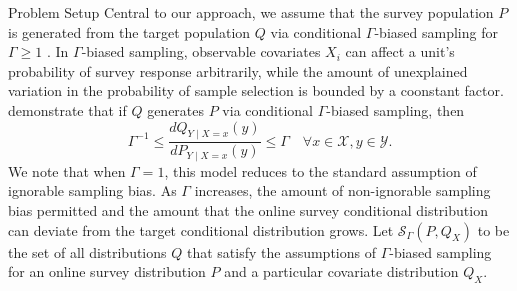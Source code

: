 \begin{subsection}{Problem Setup}
Central to our approach, we assume that the survey population $P$ is generated from the target population $Q$ via conditional $\Gamma$-biased sampling for $\Gamma \geq 1$ \citep{sahoo2022learning}. In $\Gamma$-biased sampling, observable covariates $X_{i}$ can affect a unit's probability of survey response arbitrarily, while the amount of unexplained variation in the probability of sample selection is bounded by a coonstant factor. \citet{sahoo2022learning} demonstrate that if $Q$ generates $P$ via conditional $\Gamma$-biased sampling, then
\begin{equation} \Gamma^{-1} \leq \frac{dQ_{Y \mid X=x}(y)}{dP_{Y \mid X=x}(y)} \leq \Gamma \quad \forall x \in \mathcal{X}, y \in \mathcal{Y}.\end{equation}
We note that when $\Gamma = 1$, this model reduces to the standard assumption of ignorable sampling bias. As $\Gamma$ increases, the amount of non-ignorable sampling bias permitted and the amount that the online survey conditional distribution can deviate from the target conditional distribution grows. Let $\mathcal{S}_\Gamma(P, Q_X)$ to be the set of all distributions $Q$ that satisfy the assumptions of $\Gamma$-biased sampling for an online survey distribution $P$ and a particular covariate distribution $Q_X$.

\end{subsection}

